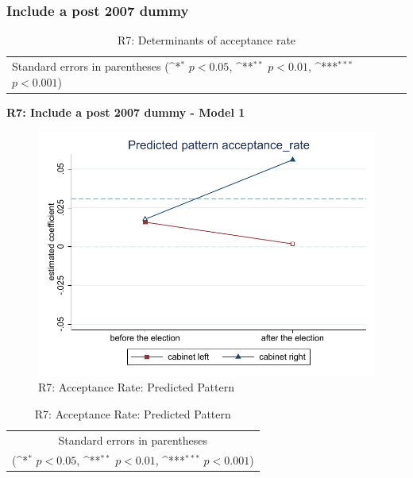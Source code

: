 \documentclass[10pt,a4paper]{scrartcl}
\begin{document}


\clearpage
\FloatBarrier
\subsubsection{Include a post 2007 dummy}
\begin{table}[!ht]\centering
	\renewcommand{\arraystretch}{1.25}
	\small
	\def\sym#1{\ifmmode^{#1}\else\(^{#1}\)\fi}
	\caption{R7: Determinants of acceptance rate}
	\begin{tabular}{l*{2}{c}}
		\hline\hline
		
		\hline\hline
		\multicolumn{3}{l}{\footnotesize Standard errors in parentheses (\sym{*} \(p<0.05\), \sym{**} \(p<0.01\), \sym{***} \(p<0.001\))}\\
	\end{tabular}
\end{table}

\clearpage
\textbf{R7: Include a post 2007 dummy - Model 1}
\begin{figure}[!ht]
	\centering
	\includegraphics[width=1\textwidth]{figures_edited/acceptance_rate_graph1_R7.pdf}
	\caption{R7: Acceptance Rate: Predicted Pattern}
\end{figure}

\begin{table}[!ht]\centering
	\renewcommand{\arraystretch}{1.25}
	\def\sym#1{\ifmmode^{#1}\else\(^{#1}\)\fi}
	\caption{R7: Acceptance Rate: Predicted Pattern}
	\begin{tabular}{l*{2}{c}}
		\hline\hline
		
		\hline\hline
		\multicolumn{3}{c}{\footnotesize Standard errors in parentheses} \\
		\multicolumn{3}{c}{\footnotesize (\sym{*} \(p<0.05\), \sym{**} \(p<0.01\), \sym{***} \(p<0.001\))}\\
	\end{tabular}
\end{table}
\end{document}

